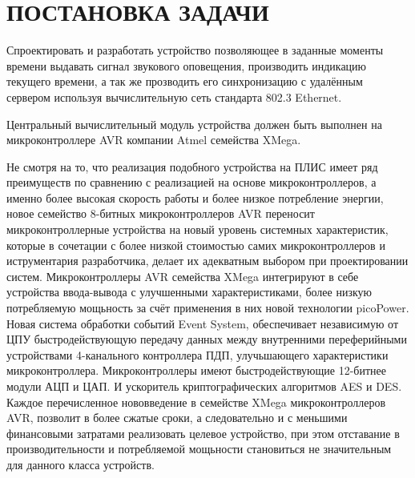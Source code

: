 \section{ПОСТАНОВКА ЗАДАЧИ}
\begin{par}
Спроектировать и разработать устройство позволяющее в заданные моменты времени выдавать сигнал
звукового оповещения, производить индикацию текущего времени, а так же прозводить его синхронизацию
с удалённым сервером используя вычислительную сеть стандарта 802.3 Ethernet.
\end{par}

\begin{par}
Центральный вычислительный модуль устройства должен быть выполнен на микроконтроллере AVR компании
Atmel семейства XMega.
\end{par}

\begin{par}
Не смотря на то, что реализация подобного устройства на ПЛИС имеет ряд преимуществ по
сравнению с реализацией на основе микроконтроллеров, а именно более высокая скорость
работы и более низкое потребление энергии, новое семейство 8-битных микроконтроллеров
AVR переносит микроконтроллерные устройства на новый уровень системных характеристик,
которые в сочетации с более низкой стоимостью самих микроконтроллеров и иструментария
разработчика, делает их адекватным выбором при проектировании систем. Микроконтроллеры
AVR семейства XMega интегрируют в себе устройства ввода-вывода с улучшенными характеристиками,
более низкую потребляемую мощьность за счёт применения в них новой технологии picoPower.
Новая система обработки событий Event System, обеспечивает независимую от ЦПУ
быстродействующую передачу данных между внутренними переферийными устройствами 4-канального
контроллера ПДП, улучьшающего характеристики микроконтроллера. Микроконтроллеры имеют
быстродействующие 12-битнее модули АЦП и ЦАП. И ускоритель криптографических алгоритмов AES и DES.
Каждое перечисленное нововведение в семействе XMega микроконтроллеров AVR, позволит
в более сжатые сроки, а следовательно и с меньшими финансовыми затратами реализовать
целевое устройство, при этом отставание в производительности и потребляемой мощьности
становиться не значительным для данного класса устройств.
\end{par}


